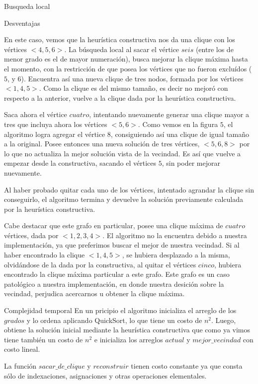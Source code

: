 \begin{section}{Busqueda local}
\begin{subsection}{Desventajas}
\begin{itemize}
					En este caso, vemos que la heurística constructiva nos da una clique con los vértices $<4,5,6>$. La búsqueda local al sacar el vértice $seis$ (entre los de menor grado es el de mayor numeración), busca mejorar la clique máxima hasta el momento, con la restricción de que posea los vértices que no fueron excluídos ($5$, y $6$). Encuentra así una nueva clique de tres nodos, formada por los vértices $<1,4,5>$. Como la clique es del mismo tamaño, es decir no mejoró con respecto a la anterior, vuelve a la clique dada por la heurística constructiva.

					Saca ahora el vértice $cuatro$, intentando nuevamente generar una clique mayor a tres que incluya ahora los vértices $<5,6>$. Como vemos en la figura $5$, el algoritmo logra agregar el vértice $8$, consiguiendo así una clique de igual tamaño a la original. Posee entonces una nueva solución de tres vértices, $<5,6,8>$ por lo que no actualiza la mejor solución vista de la vecindad. Es así que vuelve a empezar desde la constructiva, sacando el vértices $5$, sin poder mejorar nuevamente.

					Al haber probado quitar cada uno de los vértices, intentado agrandar la clique sin conseguirlo, el algoritmo termina y devuelve la solución previamente calculada por la heurística constructiva.

					Cabe destacar que este grafo en particular, posee una clique máxima de $cuatro$ vértices, dada por $<1,2,3,4>$. El algoritmo no la encuentra debido a nuestra implementación, ya que preferimos buscar el mejor de nuestra vecindad. Si al haber encontrado la clique $<1,4,5>$, se hubiera desplazado a la misma, olvidándose de la dada por la constructiva, al quitar el vértices $cinco$, hubiera encontrado la clique máxima particular a este grafo. Este grafo es un caso patológico a nuestra implementación, en donde nuestra desición sobre la vecindad, perjudica acercarnos u obtener la clique máxima.
			\end{itemize}
		\end{subsection}
		\begin{subsection}{Complejidad temporal}
			En un pricipio el algoritmo inicializa el arreglo de los $grados$ y lo ordena aplicando QuickSort, lo que tiene un costo de $n^2$. Luego, obtiene la solución inicial mediante la heurística constructiva que como ya vimos tiene también un costo de $n^2$ e inicializa los arreglos $actual$ y $mejor\_vecindad$ con costo lineal.

			La función $sacar\_de\_clique$ y $reconstruir$ tienen costo constante ya que consta sólo de indexaciones, asignaciones y otras operaciones elementales.


\end{subsection}
\end{section}
